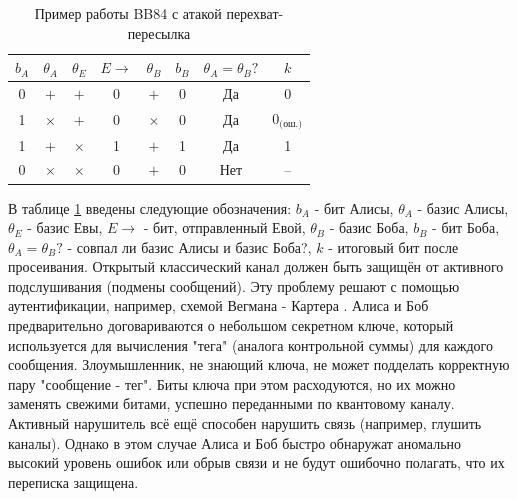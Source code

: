 \begin{table}[h]
\centering
\caption{Пример работы BB84 с атакой перехват-пересылка}
\begin{tabular}{c c c c c c c c}
\toprule
$b_A$ & $\theta_A$ & $\theta_E$ & $E\to$ & $\theta_B$ & $b_B$ & $\theta_A=\theta_B?$ & $k$ \\
\midrule
0 & $+$ & $+$ & 0 & $+$ & 0 & Да & 0 \\
1 & $\times$ & $+$ & 0 & $\times$ & 0 & Да & $0_{\text{(ош.)}}$ \\
1 & $+$ & $\times$ & 1 & $+$ & 1 & Да & 1 \\
0 & $\times$ & $\times$ & 0 & $+$ & 0 & Нет & -- \\
\bottomrule
\end{tabular}
\label{tab:bb84_compact}
\end{table}
В таблице \ref{tab:bb84_compact} введены следующие обозначения: $b_A$ - бит Алисы, $\theta_A$ - базис Алисы, $\theta_E$ - базис Евы, $E\to$ - бит, отправленный Евой, $\theta_B$ - базис Боба, $b_B$ - бит Боба,  $\theta_A=\theta_B?$ - совпал ли базис Алисы и базис Боба?, $k$ - итоговый бит после просеивания. 
Открытый классический канал должен быть защищён от активного подслушивания (подмены сообщений). Эту проблему решают с помощью аутентификации, например, схемой Вегмана - Картера \cite{abidin2014}. Алиса и Боб предварительно договариваются о небольшом секретном ключе, который используется для вычисления "тега" (аналога контрольной суммы) для каждого сообщения. Злоумышленник, не знающий ключа, не может подделать корректную пару "сообщение - тег". Биты ключа при этом расходуются, но их можно заменять свежими битами, успешно переданными по квантовому каналу. Активный нарушитель всё ещё способен нарушить связь (например, глушить каналы). Однако в этом случае Алиса и Боб быстро обнаружат аномально высокий уровень ошибок или обрыв связи и не будут ошибочно полагать, что их переписка защищена.

